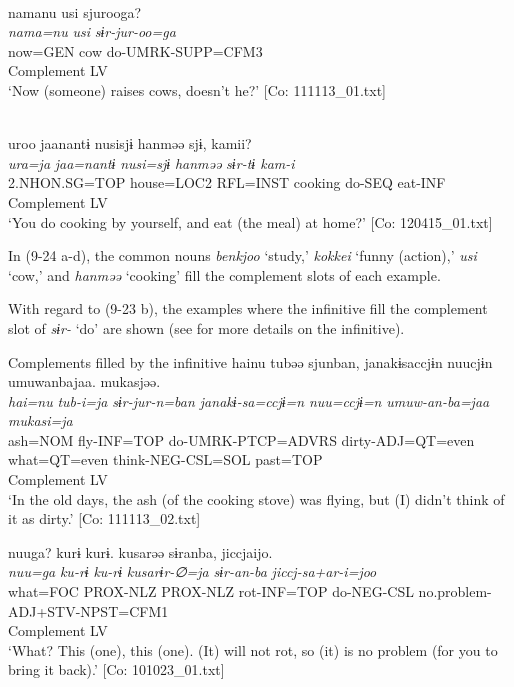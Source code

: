 \ex\relax  [= (8-61 a)]\\
    \gllll  namanu  usi  sjurooga?\\
      \textit{nama=nu}  \textit{usi}  \textit{sɨr{}-jur-oo=ga}\\
      now=GEN  cow  do-UMRK-SUPP=CFM3\\
        Complement  LV\\
      \glt       ‘Now (someone) raises cows, doesn’t he?’ [Co: 111113\_01.txt]

\ex\relax [= (6-65 b)]\\
    \gllll  uroo  jaanantɨ  nusisjɨ  hanməə  sjɨ,  kamii?\\
      \textit{ura=ja}  \textit{jaa=nantɨ}  \textit{nusi=sjɨ}  \textit{hanməə}  \textit{sɨr{}-tɨ  kam-i}\\
      2.NHON.SG=TOP  house=LOC2  RFL=INST  cooking  do-SEQ  eat-INF\\
            Complement  LV  \\
      \glt       ‘You do cooking by yourself, and eat (the meal) at home?’ [Co: 120415\_01.txt]
    \z
\z

In (9-24 a-d), the common nouns \textit{benkjoo} ‘study,’ \textit{kokkei} ‘funny (action),’ \textit{usi} ‘cow,’ and \textit{hanməə} ‘cooking’ fill the complement slots of each example.

With regard to (9-23 b), the examples where the infinitive fill the complement slot of \textit{sɨr-} ‘do’ are shown (see  for more details on the infinitive).

\ea   Complements filled by the infinitive \label{ex:9.25}
\ea \label{ex:9.25a}%
 \gllll  hainu  tubəə  sjunban,  janakɨsaccjɨn  nuucjɨn  umuwanbajaa.  mukasjəə.\\
      \textit{hai=nu}  \textit{tub-i=ja}  \textit{sɨr{}-jur-n=ban  janakɨ-sa=ccjɨ=n}    \textit{nuu=ccjɨ=n}  \textit{umuw-an-ba=jaa}  \textit{mukasi=ja}\\
      ash=NOM  fly-INF=TOP  do-UMRK-PTCP=ADVRS  dirty-ADJ=QT=even  what=QT=even  think-NEG-CSL=SOL  past=TOP\\
        Complement  LV      \\
    \glt       ‘In the old days, the ash (of the cooking stove) was flying, but (I) didn’t think of it as dirty.’ [Co: 111113\_02.txt]

\ex \label{ex:9.25b} %
    \gllll  nuuga?  kurɨ  kurɨ.  kusarəə  sɨranba,   jiccjaijo.\\
      \textit{nuu=ga}  \textit{ku-rɨ}  \textit{ku-rɨ}  \textit{kusarɨr-∅=ja}  \textit{sɨr{}-an-ba}   \textit{jiccj-sa+ar-i=joo}\\
      what=FOC  PROX-NLZ  PROX-NLZ  rot-INF=TOP  do-NEG-CSL   no.problem-ADJ+STV-NPST=CFM1\\
            Complement  LV\\
    \glt       ‘What? This (one), this (one). (It) will not rot, so (it) is no problem (for you to bring it back).’ [Co: 101023\_01.txt]

